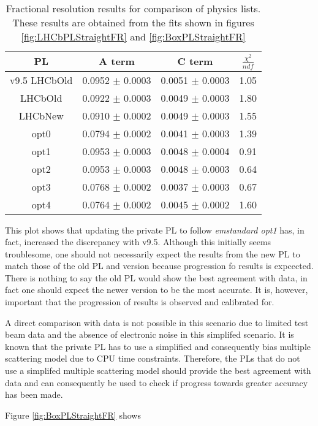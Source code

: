 \begin{table}[h]
  \centering
  \begin{tabular}{|c|c|c|c|}
      \hline
      PL & A term & C term & $\frac{\chi^2}{ndf}$  \\ \hline
      v9.5 LHCbOld & 0.0952 $\pm$ 0.0003 & 0.0051 $\pm$ 0.0003 & 1.05 \\ \hline
      LHCbOld & 0.0922 $\pm$ 0.0003 & 0.0049 $\pm$ 0.0003 & 1.80 \\ \hline 
      LHCbNew & 0.0910 $\pm$ 0.0002 & 0.0049 $\pm$ 0.0003 & 1.55 \\ \hline
      opt0 & 0.0794 $\pm$ 0.0002 & 0.0041 $\pm$ 0.0003 & 1.39 \\ \hline
      opt1 & 0.0953 $\pm$ 0.0003 & 0.0048 $\pm$ 0.0004 & 0.91 \\ \hline
      opt2 & 0.0953 $\pm$ 0.0003 & 0.0048 $\pm$ 0.0003 & 0.64 \\ \hline 
      opt3 & 0.0768 $\pm$ 0.0002 & 0.0037 $\pm$ 0.0003 & 0.67 \\ \hline 
      opt4 & 0.0764 $\pm$ 0.0002 & 0.0045 $\pm$ 0.0002 & 1.60 \\ \hline
  \end{tabular}
  \caption{Fractional resolution results for comparison of \geant physics lists.  These results are obtained from the fits shown in figures \ref{fig:LHCbPLStraightFR} and \ref{fig:BoxPLStraightFR}}
  \label{tab:results}
\end{table}






This plot shows that updating the \lhcb private PL to follow \textit{emstandard opt1} has, in fact, increased the discrepancy with v9.5.  Although this initially seems troublesome, one should not necessarily expect the results from the new PL to match those of the old PL and \geant version because progression fo results is expcected.  There is nothing to say the old PL would show the best agreement with data, in fact one should expect the newer version to be the most accurate.  It is, however, important that the progression of results is observed and calibrated for.

A direct comparison with data is not possible in this scenario due to limited test beam data and the absence of electronic noise in this simplifed scenario.   It is known that the \lhcb private PL has to use a simplified and consequently bias multiple scattering model due to CPU time constraints.  Therefore, the PLs that do not use a simplifed multiple scattering model should provide the best agreement with data and can consequently be used to check if progress towards greater accuracy has been made.

Figure \ref{fig:BoxPLStraightFR} shows 



